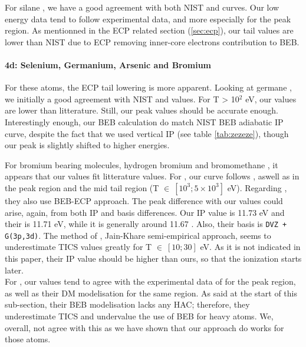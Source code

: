 \documentclass[article,preview]{planetary}
\newcommand{\sn}[2]{\ensuremath{#1\times 10^{#2}}}
\begin{document}
For silane , we have a good agreement with both NIST and \textcite[SCOP]{vinodkumarElectronImpactCalculations2011} curves. Our low energy data tend to follow experimental data, and more especially \textcite{kurachiElectronCollisionCross1989,basnerDissociativeIonizationSilane1997} for the peak region. As mentionned in the ECP related section (\ref{sec:ecp}), our tail values are lower than NIST due to ECP removing inner-core electrons contribution to BEB. 

\paragraph{4d: Selenium, Germanium,  Arsenic and Bromium}
For these atoms, the ECP tail lowering is more apparent. Looking at germane , we initially a good agreement with NIST and \textcite[SCOP]{vinodkumarElectronImpactCalculations2008} values. For T > 10$^2$ eV, our values are lower than litterature. Still, our peak values should be accurate enough. Interestingly enough, our BEB calculation do match NIST BEB adiabatic IP curve, despite the fact that we used vertical IP (see table \ref{tab:zezeze}), though our peak is slightly shifted to higher energies.

For bromium bearing molecules, hydrogen bromium  and bromomethane , it appears that our values fit litterature values. For  , our curve follows \textcite{aliIonizationCrossSections2008,vinodkumarElectronImpactTotal2010}, aswell as \textcite{sharmaAbsoluteIonizationCross2020} in the peak region and the mid tail region (T $\in~[10^3; \sn{5}{3}]$ eV).  Regarding \textcite{aliIonizationCrossSections2008}, they also use BEB-ECP approach. The peak difference with our values could arise, again, from both IP and basis differences. Our IP value is 11.73 eV and their is 11.71 eV, while it is generally around 11.67 \parencite{tiedemannProtonAffinitiesHydrogen1979,huberMolecularSpectraMolecular1979}. Also, their basis is \verb|DVZ + G(3p,3d)|. The method of \textcite{sharmaAbsoluteIonizationCross2020}, Jain-Khare semi-empirical approach, seems to underestimate TICS values greatly for T $\in~[10;30]$ eV. As it is not indicated in this paper, their IP value should be higher than ours, so that the ionization starts later.\\
For , our values tend to agree with the experimental data of \textcite{vallanceAbsoluteElectronImpact1997} for the peak region, as well as their DM modelisation for the same region. As said at the start of this sub-section, their BEB modelisation lacks any HAC; therefore, they underestimate TICS and undervalue the use of BEB for heavy atoms. We, overall, not agree with this as we have shown that our approach do works for those atoms.
\end{document}
